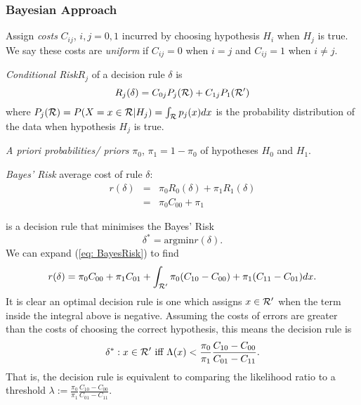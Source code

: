 \subsubsection{Bayesian Approach}

Assign \textit{costs} $C_{ij}$, $i,j=0,1$ incurred by choosing hypothesis $H_i$ when $H_j$ is true. We say these costs are \textit{uniform} if $C_{ij}=0$ when $i=j$ and $C_{ij}=1$ when $i \neq j$. 

\textit{Conditional Risk}$R_j$ of a decision rule $\delta$ is 
\begin{equation}
\label{eq:conditionalrisk}
R_j(\delta)=C_{0j}P_j(\mathcal{R})+C_{1j}P_1(\mathcal{R}')
\end{equation}
where $P_j(\mathcal{R})=P(X=x\in \mathcal{R} | H_j)= \int_{\mathcal{R}} p_j(x)dx$ is the probability distribution of the data when hypothesis $H_j$ is true.

\textit{A priori probabilities/ priors} $\pi_0$, $\pi_1=1-\pi_0$ of hypotheses $H_0$ and $H_1$.

\textit{Bayes' Risk} average cost of rule $\delta$:
\begin{equation}\label{eq: BayesRisk}\begin{array}{rcl}
r(\delta)&=&\pi_0 R_0(\delta) + \pi_1 R_1(\delta) \\
&=& \pi_0 C_{00} + \pi_1
\end{array}
\end{equation}

 is a decision rule that minimises the Bayes' Risk
\begin{equation}
\label{eq:BayesRule}
\delta^* = \mbox{argmin} r(\delta). 
\end{equation}
We can expand (\ref{eq: BayesRisk}) to find 
\begin{equation}
r(\delta)=\pi_0 C_{00} + \pi_1 C_{01} + \int_{\mathcal{R}'} \pi_0(C_{10}-C_{00}) + \pi_1(C_{11}-C_{01}) dx.
\end{equation}
It is clear an optimal decision rule is one which assigns $x \in \mathcal{R}'$ when the term inside the integral above is negative. Assuming the costs of errors are greater than the costs of choosing the correct hypothesis, this means the decision rule is 
\begin{equation}
\delta^*: x \in \mathcal{R}' \mbox{ iff } \Lambda(x) < \frac{\pi_0}{\pi_1}\frac{C_{10}-C_{00}}{C_{01}-C_{11}}.
\end{equation}
That is, the decision rule is equivalent to comparing the likelihood ratio to a threshold $\lambda := \frac{\pi_0}{\pi_1}\frac{C_{10}-C_{00}}{C_{01}-C_{11}}$.

